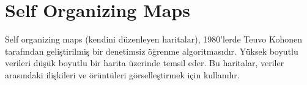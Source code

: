 \section{Self Organizing Maps}

Self organizing maps (kendini düzenleyen haritalar), 1980'lerde Teuvo Kohonen tarafından geliştirilmiş bir denetimsiz öğrenme algoritmasıdır. Yüksek boyutlu verileri düşük boyutlu bir harita üzerinde temsil eder. Bu haritalar, veriler arasındaki ilişkileri ve örüntüleri görselleştirmek için kullanılır.

\newpage